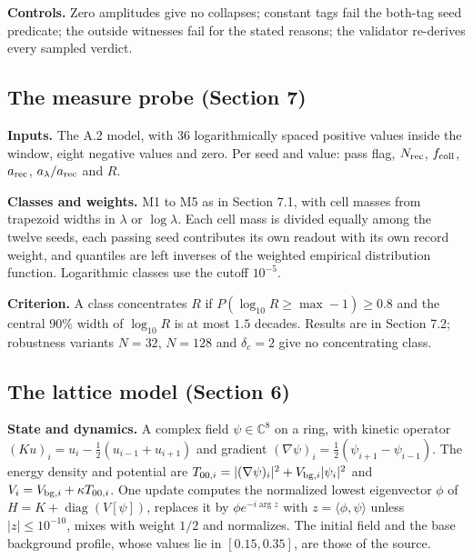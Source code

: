 \textbf{Controls.} Zero amplitudes give no collapses; constant tags fail
the both-tag seed predicate; the outside witnesses fail for the stated
reasons; the validator re-derives every sampled verdict.

\hypertarget{a.3-the-measure-probe-section-7}{%
\subsection{The measure probe (Section
7)}\label{a.3-the-measure-probe-section-7}}

\textbf{Inputs.} The A.2 model, with 36 logarithmically spaced positive
values inside the window, eight negative values and zero. Per seed and
value: pass flag, \(N_{\rm rec}\), \(f_{\rm coll}\), \(a_{\rm rec}\),
\(a_\lambda/a_{\rm rec}\) and \(R\).

\textbf{Classes and weights.} M1 to M5 as in Section 7.1, with cell
masses from trapezoid widths in \(\lambda\) or \(\log\lambda\). Each
cell mass is divided equally among the twelve seeds, each passing seed
contributes its own readout with its own record weight, and quantiles
are left inverses of the weighted empirical distribution function.
Logarithmic classes use the cutoff \(10^{-5}\).

\textbf{Criterion.} A class concentrates \(R\) if
\(P(\log_{10}R\ge\max-1)\ge0.8\) and the central 90\% width of
\(\log_{10}R\) is at most \(1.5\) decades. Results are in Section 7.2;
robustness variants \(N=32\), \(N=128\) and \(\delta_c=2\) give no
concentrating class.

\hypertarget{a.4-the-lattice-model-section-6}{%
\subsection{The lattice model (Section
6)}\label{a.4-the-lattice-model-section-6}}

\textbf{State and dynamics.} A complex field \(\psi\in\mathbb C^8\) on a
ring, with kinetic operator \((Ku)_i=u_i-\tfrac12(u_{i-1}+u_{i+1})\) and
gradient \((\nabla\psi)_i=\tfrac12(\psi_{i+1}-\psi_{i-1})\). The energy
density and potential are
\(T_{00,i}=|(\nabla\psi)_i|^2+V_{{\rm bg},i}|\psi_i|^2\) and
\(V_i=V_{{\rm bg},i}+\kappa T_{00,i}\). One update computes the
normalized lowest eigenvector \(\phi\) of
\(H=K+\operatorname{diag}(V[\psi])\), replaces it by
\(\phi e^{-i\arg z}\) with \(z=\langle\phi,\psi\rangle\) unless
\(|z|\le10^{-10}\), mixes with weight \(1/2\) and normalizes. The
initial field and the base background profile, whose values lie in
\([0.15,0.35]\), are those of the source.


